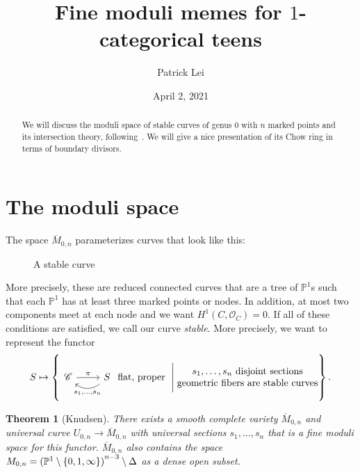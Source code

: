 \documentclass{amsart}
\title{Fine moduli memes for $1$-categorical teens}
\author{Patrick Lei}
\date{April 2, 2021}
\newtheorem{thm}{Theorem}[section]
\theoremstyle{definition}
\theoremstyle{remark}
\theoremstyle{plain}
\theoremstyle{definition}
\theoremstyle{remark}
\renewcommand{\P}{\mathbb{P}}
\newcommand{\msc}[1]{\mathscr{#1}}
\newcommand{\ol}[1]{\overline{#1}}
\begin{document}
    
\maketitle

\begin{abstract}
    We will discuss the moduli space of stable curves of genus $0$ with $n$ marked points and its intersection theory, following~\cite{keel}. We will give a nice presentation of its Chow ring in terms of boundary divisors.
\end{abstract}

\section{The moduli space}%
\label{sec:the_moduli_space}

The space $\ol{M}_{0,n}$ parameterizes curves that look like this:
\begin{figure}[H]
\begin{center}
\end{center}
\caption{A stable curve}%
\label{fig:stabcurve}
\end{figure}
More precisely, these are reduced connected curves that are a tree of $\P^1$s such that each $\P^1$ has at least three marked points or nodes. In addition, at most two components meet at each node and we want $H^1(C, \msc{O}_C) = 0$. If all of these conditions are satisfied, we call our curve \textit{stable}. More precisely, we want to represent the functor
\[ S \mapsto \left\{ 
\begin{tikzcd}
    \msc{C} \ar{r}{\pi} & S \ar[bend left=40]{l}{s_1, \ldots, s_n}   
\end{tikzcd} \text{ flat, proper } \Biggm\vert \Centerstack{ {$s_1, \ldots, s_n$ disjoint sections} {geometric fibers are stable curves} }
\right\}. \]

\begin{thm}[Knudsen]
    There exists a smooth complete variety $\ol{M}_{0,n}$ and universal curve $U_{0,n} \to \ol{M}_{0,n}$ with universal sections $s_1, \ldots, s_n$ that is a fine moduli space for this functor. $\ol{M}_{0,n}$ also contains the space $M_{0,n} = {(\P^1 \setminus \qty{0,1,\infty})}^{n-3} \setminus \Delta$ as a dense open subset.
\end{thm}
\end{document}
